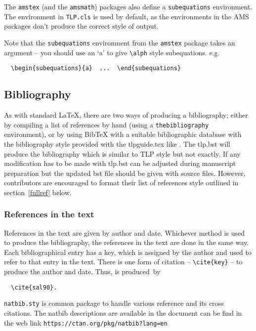 \documentclass{tlp}
\begin{document}
The \verb"amstex" (and the \verb"amsmath") packages also define a
\verb"subequations" environment.  The environment in \verb"TLP.cls" is used
by default, as the environments in the AMS packages don't produce the correct
style of output.

Note that the \verb"subequations" environment from the \verb"amstex" package
takes an argument -- you should use an `a' to give \verb"\alph" style
subequations. e.g.
\begin{verbatim}
  \begin{subequations}{a}  ...  \end{subequations}
\end{verbatim}

\subsection{Bibliography}

As with standard \LaTeX, there are two ways of producing a bibliography;
either by compiling a list of references by hand (using a
\verb"thebibliography" environment), or by using BibTeX with a suitable
bibliographic database with the bibliography style provided with the tlpguide.tex like \verb"". The tlp.bst will produce the bibliography which is similar to TLP style but not exactly. If any modification has to be made with tlp.bst can be adjusted during manuscript preparation but the updated bst file should be given with source files. However, contributors are encouraged to format
their list of references style outlined in section~\ref{fullref}
below.

\subsubsection{References in the text}

References in the text are given by author and date.
Whichever method is used to produce the bibliography, the references in
the text are done in the same way. Each bibliographical entry has a key,
which is assigned by the author and used to refer to that entry in the
text. There is one form of citation -- \verb"\cite{key}" -- to produce the
author and date. Thus, \cite{sal90} is produced~by
\begin{verbatim}
  \cite{sal90}.
\end{verbatim}

\verb"natbib.sty" is common package to handle various reference and its cross citations. The natbib descriptions are available in the document can be find in the web link \verb"https://ctan.org/pkg/natbib?lang=en"
\end{document}
